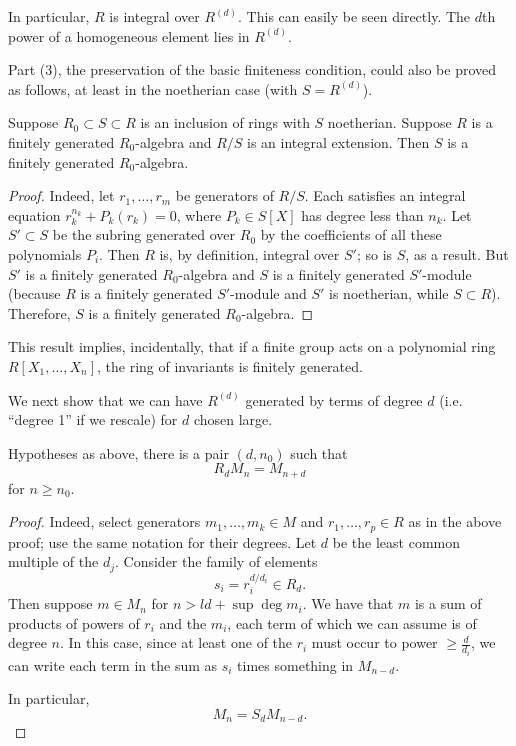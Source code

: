 In particular, $R$ is integral over $R^{(d)}$. This can easily be seen
directly. The $d$th power of a homogeneous element lies in $R^{(d)}$.  
\begin{remark} 
Part (3), the preservation of the basic finiteness condition, could also be
proved as follows, at least in the noetherian case (with $S = R^{(d)}$). 
\begin{lemma} 
Suppose $R_0 \subset S \subset R$ is an inclusion of rings with $S$ noetherian. Suppose $R$ is a
finitely generated $R_0$-algebra and $R/S$ is an integral extension. Then $S$
is a finitely generated $R_0$-algebra.
\end{lemma} 
\begin{proof} 
Indeed, let $r_1, \dots, r_m$ be generators of $R/S$. Each satisfies an
integral equation $r_k^{n_k} + P_k(r_k) = 0$, where $P_k \in S[X]$ has degree
less than $n_k$. Let $S' \subset S$ be the subring generated over $R_0$ by the
coefficients of all these polynomials $P_i$.  
Then $R$ is, by definition, integral over $S'$; so is $S$, as a result. But
$S'$ is a finitely generated $R_0$-algebra and $S$ is a finitely generated
$S'$-module (because $R$ is a finitely generated $S'$-module and $S'$ is
noetherian, while $S \subset R$). Therefore, $S$ is a finitely generated $R_0$-algebra.
\end{proof} 
This result implies, incidentally, that if a finite group acts on a polynomial
ring $R[X_1, \dots, X_n]$, the ring of invariants is finitely generated.
\end{remark} 

We next show that we can have $R^{(d)}$ generated by terms of degree $d$ (i.e.
``degree 1'' if we rescale) for $d$ chosen large.
\begin{lemma} 
Hypotheses as above, there is a pair $(d, n_0)$ such that
\[  R_d M_n = M_{n+d}  \]
for $n \geq n_0$.
\end{lemma} 
\begin{proof} 
Indeed, select generators $m_1, \dots, m_k \in M$ and $r_1, \dots, r_p \in R$
as in the above proof; use the same notation for their degrees.
Let $d $ be the least common multiple of the $d_j$.  Consider the family of
elements
\[  s_i = r_i^{d/d_i} \in R_d. \]
Then suppose $m \in M_n$ for $n>ld + \sup \deg m_i$.  We have that $m$ is a sum
of products of powers of $r_i$ and the $m_i$, each term of which we can assume is
of degree $n$.  In this case, since at least one
of the $r_i$ must occur to power $\geq \frac{d}{d_i}$, we can write each term
in the sum as $s_i$ times something in $M_{n-d}$. 

In particular,
\[ M_n  = S_d M_{n-d}.  \]
\end{proof} 

